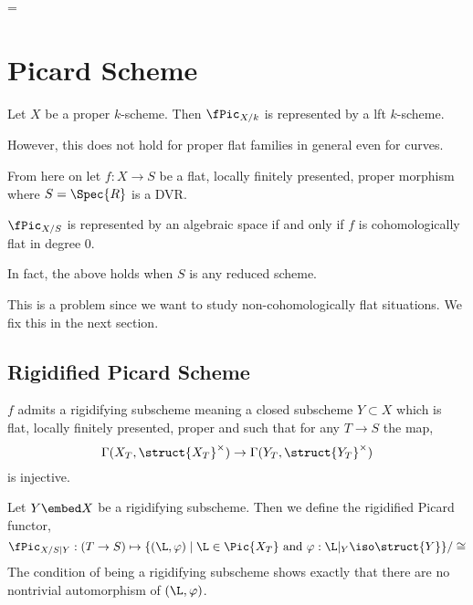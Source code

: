 =\documentclass[12pt]{article}
\begin{document}
\section{Picard Scheme}

\begin{theorem}
Let $X$ be a proper $k$-scheme. Then $\fPic_{X/k}$ is represented by a lft $k$-scheme. 
\end{theorem}

\begin{rmk}
However, this does not hold for proper flat families in general even for curves. 
\end{rmk}

From here on let $f : X \to S$ be a flat, locally finitely presented, proper morphism where $S = \Spec{R}$ is a DVR. 

\begin{theorem}[8.3.2]
$\fPic_{X/S}$ is represented by an algebraic space if and only if $f$ is cohomologically flat in degree $0$.
\end{theorem}

\begin{rmk}
In fact, the above holds when $S$ is any reduced scheme.
\end{rmk}

This is a problem since we want to study non-cohomologically flat situations. We fix this in the next section.

\subsection{Rigidified Picard Scheme}

\begin{prop}[8.1.6]
$f$ admits a rigidifying subscheme meaning a closed subscheme $Y \subset X$ which is flat, locally finitely presented, proper and such that for any $T \to S$ the map,
\[ \Gamma(X_T, \struct{X_T}^\times) \to \Gamma(Y_T, \struct{Y_T}^\times) \]
is injective.  
\end{prop}


\begin{defn}
Let $Y \embed X$ be a rigidifying subscheme. Then we define the rigidified Picard  functor,
\[ \fPic_{X/S|Y} : (T \to S) \mapsto \{ (\L, \varphi) \mid \L \in \Pic{X_T} \text{ and } \varphi : \L|_Y \iso \struct{Y} \} / \cong \]
The condition of being a rigidifying subscheme shows exactly that there are no nontrivial automorphism of $(\L, \varphi)$. 
\end{defn}
\end{document}

